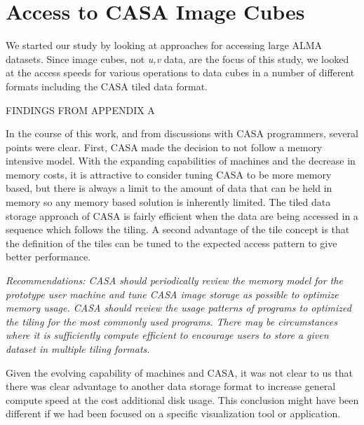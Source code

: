 \section{Access to CASA Image Cubes}

We started our study by looking at approaches for accessing large
ALMA datasets. Since image cubes, not {\it u,v} data, are the
focus of this study, we looked at the access speeds for various
operations to data cubes in a number of different formats including
the CASA tiled data format.

FINDINGS FROM APPENDIX A

In the course of this work, and from discussions with CASA programmers,
several points were clear. First, CASA made the decision to not follow
a memory intensive model. With the expanding capabilities of machines and
the decrease in memory costs, it is attractive to consider tuning CASA
to be more memory based, but there is always a limit to the amount of
data that can be held in memory so any memory based solution is 
inherently limited. The tiled data storage approach of CASA is
fairly efficient when the data are being accessed in a sequence which
follows the tiling. A second advantage of the tile concept is that
the definition of the tiles can be tuned to the expected access pattern
to give better performance.

{\it Recommendations: CASA should periodically review the memory model
for the prototype user machine and tune CASA image storage as possible to optimize
memory usage. CASA should review the usage patterns of programs to
optimized the tiling for the most commonly used programs. There may be
circumstances where it is sufficiently compute efficient to encourage users
to store a given dataset in multiple tiling formats.}

Given the evolving capability of machines and CASA, it was not clear to us
that there was clear advantage to another data storage format to increase
general compute speed at the cost additional disk usage. This conclusion
might have been different if we had been focused on a specific visualization
tool or application.

